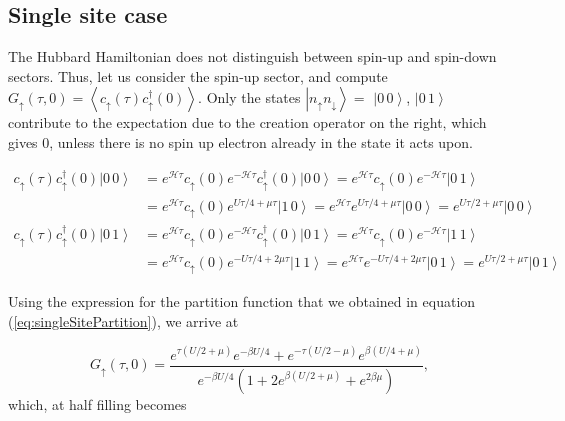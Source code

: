\subsection{Single site case}

The Hubbard Hamiltonian does not distinguish between spin-up and spin-down sectors.
Thus, let us consider the spin-up sector, and compute $G_\uparrow (\tau, 0) =  \left\langle c_{\uparrow} ( \tau) c_{\uparrow}^\dagger ( 0 ) \right\rangle$.
Only the states $\left| n_{\uparrow} n_{\downarrow} \right\rangle = $ $\left| 0\, 0 \right\rangle$, $\left| 0\, 1 \right\rangle$ contribute to the expectation due to the creation operator on the right, which gives 0, unless there is no spin up electron already in the state it acts upon.

\begin{equation}
\begin{split}
c_{\uparrow} ( \tau) c_{\uparrow}^\dagger ( 0 )  \left| 0\, 0 \right\rangle &= e^{\mathcal{H} \tau } c_{\uparrow} ( 0 ) e^{-\mathcal{H} \tau } c_{\uparrow}^\dagger ( 0 )  \left| 0\, 0 \right\rangle = e^{\mathcal{H} \tau } c_{\uparrow} ( 0 ) e^{-\mathcal{H} \tau } \left| 0\, 1 \right\rangle \\
 &= e^{\mathcal{H} \tau } c_{\uparrow} ( 0 ) e^{U \tau / 4 + \mu \tau } \left| 1\, 0 \right\rangle = e^{\mathcal{H} \tau } e^{U \tau / 4 + \mu \tau } \left| 0\, 0 \right\rangle = e^{U \tau / 2 + \mu \tau } \left| 0\, 0 \right\rangle \\
 c_{\uparrow} ( \tau) c_{\uparrow}^\dagger ( 0 )  \left| 0\, 1 \right\rangle &= e^{\mathcal{H} \tau } c_{\uparrow} ( 0 ) e^{-\mathcal{H} \tau } c_{\uparrow}^\dagger ( 0 )  \left| 0\, 1 \right\rangle = e^{\mathcal{H} \tau } c_{\uparrow} ( 0 ) e^{-\mathcal{H} \tau } \left| 1\, 1 \right\rangle \\
 &= e^{\mathcal{H} \tau } c_{\uparrow} ( 0 ) e^{- U \tau / 4 + 2 \mu \tau } \left| 1\, 1 \right\rangle = e^{\mathcal{H} \tau } e^{- U \tau / 4 + 2 \mu \tau } \left| 0\, 1 \right\rangle = e^{U \tau / 2 + \mu \tau } \left| 0\, 1 \right\rangle
\end{split}
\end{equation}

Using the expression for the partition function that we obtained in equation (\ref{eq:singleSitePartition}), we arrive at

\begin{equation}
G_\uparrow (\tau, 0) = \frac{ e^{\tau ( U / 2 + \mu )} e^{-\beta U / 4} + e^{-\tau ( U / 2 - \mu )} e^{\beta (U / 4 + \mu)} }{ e^{-\beta U / 4} ( 1 + 2 e^{\beta ( U /2 + \mu)} + e^{2\beta \mu} ) } ,
\end{equation}
which, at half filling becomes

